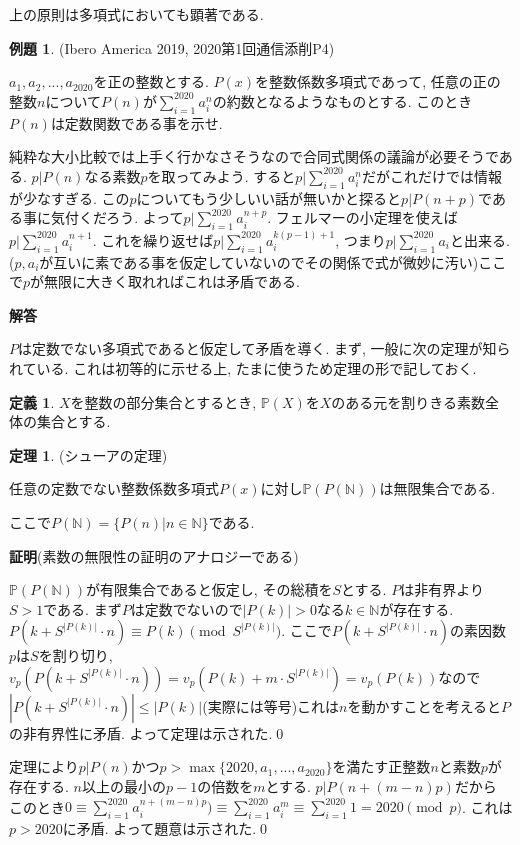 \documentclass{ltjsarticle}
\theoremstyle{definition}
\newtheorem{thm}{定理}
\newtheorem{dfn}{定義}
\newtheorem{expr}{例題}
\begin{document}
上の原則は多項式においても顕著である.
\begin{expr}(Ibero America 2019, 2020第1回通信添削P4)

$a_1,a_2,...,a_{2020}$を正の整数とする. $P(x)$を整数係数多項式であって, 任意の正の整数$n$について$P(n)$が$\displaystyle \sum_{i=1}^{2020}a_i^n$の約数となるようなものとする. このとき$P(n)$は定数関数である事を示せ.
\end{expr}

純粋な大小比較では上手く行かなさそうなので合同式関係の議論が必要そうである. $p|P(n)$なる素数$p$を取ってみよう. すると$p|\displaystyle \sum_{i=1}^{2020}a_i^n$だがこれだけでは情報が少なすぎる. この$p$についてもう少しいい話が無いかと探ると$p|P(n+p)$である事に気付くだろう. よって$p|\displaystyle \sum_{i=1}^{2020}a_i^{n+p}$. フェルマーの小定理を使えば$p|\displaystyle \sum_{i=1}^{2020}a_i^{n+1}$. これを繰り返せば$p|\displaystyle \sum_{i=1}^{2020}a_i^{k(p-1)+1}$, つまり$p|\displaystyle \sum_{i=1}^{2020}a_i$と出来る. ($p,a_i$が互いに素である事を仮定していないのでその関係で式が微妙に汚い)ここで$p$が無限に大きく取れればこれは矛盾である.

\textbf{解答}

$P$は定数でない多項式であると仮定して矛盾を導く. まず, 一般に次の定理が知られている. これは初等的に示せる上, たまに使うため定理の形で記しておく.
\begin{dfn}

$X$を整数の部分集合とするとき, $\mathbb P(X)$を$X$のある元を割りきる素数全体の集合とする.

\end{dfn}
\begin{thm}(シューアの定理)

任意の定数でない整数係数多項式$P(x)$に対し$\mathbb P(P(\mathbb N))$は無限集合である.

ここで$P(\mathbb N)=\{P(n)|n\in \mathbb N\}$である.
\end{thm}
\textbf{証明}(素数の無限性の証明のアナロジーである)

$\mathbb P(P(\mathbb N))$が有限集合であると仮定し, その総積を$S$とする. $P$は非有界より$S>1$である.
まず$P$は定数でないので$|P(k)|>0$なる$k\in \mathbb N$が存在する.  $P(k+S^{|P(k)|}\cdot n)\equiv P(k)\pmod{S^{|P(k)|}}$. ここで$P(k+S^{|P(k)|}\cdot n)$の素因数$p$は$S$を割り切り, $v_p(P(k+S^{|P(k)|}\cdot n))=v_p(P(k)+m\cdot S^{|P(k)|})=v_p(P(k))$なので$|P(k+S^{|P(k)|}\cdot n)|\leq |P(k)|$(実際には等号)これは$n$を動かすことを考えると$P$の非有界性に矛盾. よって定理は示された.\qed

定理により$p|P(n)$かつ$p>\max\{2020,a_1,...,a_{2020}\}$を満たす正整数$n$と素数$p$が存在する. $n$以上の最小の$p-1$の倍数を$m$とする. $p|P(n+(m-n)p)$だから
このとき$0\equiv\displaystyle \sum_{i=1}^{2020}a_i^{n+(m-n)p})\equiv \sum_{i=1}^{2020}a_i^m\equiv\sum_{i=1}^{2020}1=2020\pmod p$. これは$p>2020$に矛盾. よって題意は示された.\qed
\end{document}
